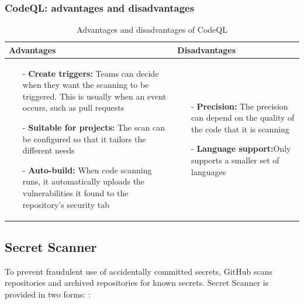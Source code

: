 \subsubsection{CodeQL: advantages and disadvantages}
\begin{table}[H]
\centering
\begin{tabular}{|>{\raggedright\arraybackslash}p{6cm}|>{\raggedright\arraybackslash}p{6cm}|}
\hline
\textbf{Advantages} & \textbf{Disadvantages} \\
\hline
\begin{itemize}
\item [-] \textbf{Create triggers:} Teams can decide when they want the scanning to be triggered. This is usually when an event occurs, such as pull requests
\item [-]\textbf{Suitable for projects:} The scan can be configured so that it tailors the different needs
\item [-] \textbf{Auto-build:} When code scanning runs, it automatically uploads the vulnerabilities it found to the repository's security tab
\end{itemize}
&
   \begin{itemize}
\item [-]\textbf{Precision:} The precision can depend on the quality of the code that it is scanning
\item [-] \textbf{Language support:}Only supports a smaller set of languages 
\end{itemize}
\\
\hline
\end{tabular}
\caption{Advantages and disadvantages of CodeQL}
\label{tab: CodeQL}
\end{table}


\subsection{Secret Scanner}
To prevent fraudulent use of accidentally committed secrets, GitHub scans repositories and archived repositories for known secrets. Secret Scanner is provided in two forms:  \cite{GithubSecretScanning}: 

